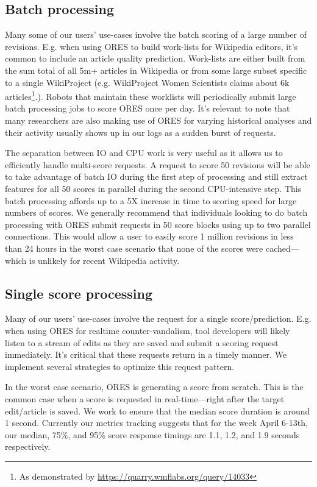 \subsection{Batch processing}
Many some of our users' use-cases involve the batch scoring of a large number of revisions.  E.g. when using ORES to build work-lists for Wikipedia editors, it's common to include an article quality prediction.  Work-lists are either built from the sum total of all 5m+ articles in Wikipedia or from some large subset specific to a single WikiProject (e.g. WikiProject Women Scientists claims about 6k articles\footnote{As demonstrated by \url{https://quarry.wmflabs.org/query/14033}}.).  Robots that maintain these worklists will periodically submit large batch processing jobs to score ORES once per day.  It's relevant to note that many researchers are also making use of ORES for varying historical analyses and their activity usually shows up in our logs as a sudden burst of requests.

The separation between IO and CPU work is very useful as it allows us to efficiently handle multi-score requests.  A request to score 50 revisions will be able to take advantage of batch IO during the first step of processing and still extract features for all 50 scores in parallel during the second CPU-intensive step.  This batch processing affords up to a 5X increase in time to scoring speed for large numbers of scores\cite{sarabadani2017building}.  We generally recommend that individuals looking to do batch processing with ORES submit requests in 50 score blocks using up to two parallel connections.  This would allow a user to easily score 1 million revisions in less than 24 hours in the worst case scenario that none of the scores were cached---which is unlikely for recent Wikipedia activity.

\subsection{Single score processing}
Many of our users' use-cases involve the request for a single score/prediction.  E.g. when using ORES for realtime counter-vandalism, tool developers will likely listen to a stream of edits as they are saved and submit a scoring request immediately.  It's critical that these requests return in a timely manner.  We implement several strategies to optimize this request pattern.

In the worst case scenario, ORES is generating a score from scratch.  This is the common case when a score is requested in real-time---right after the target edit/article is saved.  We work to ensure that the median score duration is around 1 second.  Currently our metrics tracking suggests that for the week April 6-13th, our median, 75\%, and 95\% score response timings are 1.1, 1.2, and 1.9 seconds respectively.

